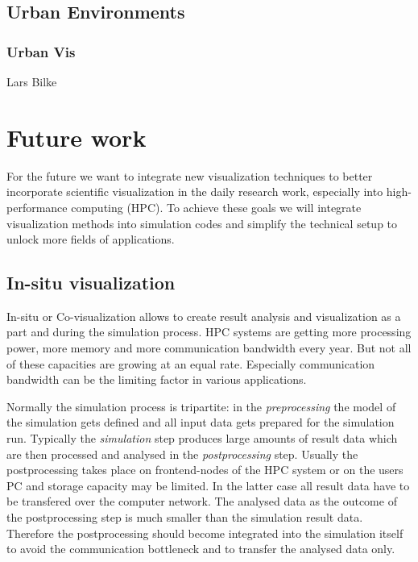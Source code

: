 \subsection{Urban Environments}
\label{urban-environments}

\subsubsection{Urban Vis}
\label{urban-vis}

Lars Bilke

\section{Future work}
\label{future-work}

For the future we want to integrate new visualization techniques to
better incorporate scientific visualization in the daily research work,
especially into high-performance computing (HPC). To achieve these goals
we will integrate visualization methods into simulation codes and simplify
the technical setup to unlock more fields of applications.

\subsection{In-situ visualization}
\label{in-situ-visualization}

In-situ or Co-visualization allows to create result analysis and
visualization as a part and during the simulation process. HPC systems
are getting more processing power, more memory and more
communication bandwidth every year. But not all of these capacities are
growing at an equal rate. Especially communication bandwidth can be the
limiting factor in various applications.

Normally the simulation process is tripartite: in the
\emph{preprocessing} the model of the simulation gets defined and all
input data gets prepared for the simulation run. Typically the
\emph{simulation} step produces large amounts of result data which are
then processed and analysed in the \emph{postprocessing} step. Usually
the postprocessing takes place on frontend-nodes of the HPC system or on
the users PC and storage capacity may be limited. In the latter case all
result data have to be transfered over the computer network. The analysed
data as the outcome of the postprocessing step is much smaller than the
simulation result data. Therefore the postprocessing should become
integrated into the simulation itself to avoid the communication bottleneck
and to transfer the analysed data only.

